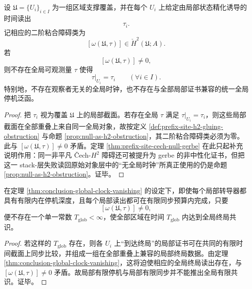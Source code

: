 \begin{theorem}[全局时钟的消失]\label{thm:conclusion-global-clock-vanishing}
设 \(\mathfrak U=\{U_i\}_{i\in I}\) 为一组区域支撑覆盖，并在每个 \(U_i\) 上给定由局部状态精化诱导的时间读出
\[
\tau_i.
\]
记相应的二阶粘合障碍类为
\[
[\omega(\mathfrak U,\tau)]\in \check H^2(\mathfrak U;A).
\]
若
\[
[\omega(\mathfrak U,\tau)]\neq 0,
\]
则不存在全局可观测量 \(\tau\) 使得
\[
\tau|_{U_i}=\tau_i
\qquad(\forall i\in I).
\]
特别地，不存在观察者无关的全局时钟，也不存在与全部局部证书兼容的统一全局停机泛函。
\end{theorem}
\begin{proof}
把 \(\tau_i\) 视为覆盖 \(\mathfrak U\) 上的局部截面。若存在全局 \(\tau\) 满足 \(\tau|_{U_i}=\tau_i\)，则这些局部截面在全部重叠上来自同一全局对象，故按定义 \ref{def:prefix-site-h2-gluing-obstruction} 与命题 \ref{prop:null-as-h2-obstruction}，其二阶粘合障碍类必须为零。此与
\(
[\omega(\mathfrak U,\tau)]\neq 0
\)
矛盾。定理 \ref{thm:prefix-site-cech-null-gerbe} 在此只起补充说明作用：同一非平凡 Čech-\(H^2\) 障碍还可被提升为 gerbe 的非中性化证书，但把这一 stack-层失败读回原始对象层中的“无全局时钟”所真正使用的仍是命题 \ref{prop:null-as-h2-obstruction}。证毕。
\end{proof}

\begin{corollary}[局部有限停机不推出全局有限共识]\label{cor:conclusion-local-finite-halting-no-global-finite-consensus}
在定理 \ref{thm:conclusion-global-clock-vanishing} 的设定下，即使每个局部转导器都具有有限内在停机深度，且每个局部读出都可在有限同步预算内完成，只要
\[
[\omega(\mathfrak U,\tau)]\neq 0,
\]
便不存在一个单一常数 \(T_{\mathrm{glob}}<\infty\)，使全部区域在时间 \(T_{\mathrm{glob}}\) 内达到全局终局共识。
\end{corollary}
\begin{proof}
若这样的 \(T_{\mathrm{glob}}\) 存在，则各 \(U_i\) 上“到达终局”的局部证书可在共同的有限时间截面上同步比较，并组成一组在全部重叠上兼容的局部终局数据。由定理 \ref{thm:conclusion-global-clock-vanishing}，这将迫使相应的全局终局读出存在，与
\(
[\omega(\mathfrak U,\tau)]\neq 0
\)
矛盾。故局部有限停机与局部有限同步并不能推出全局有限共识。证毕。
\end{proof}

